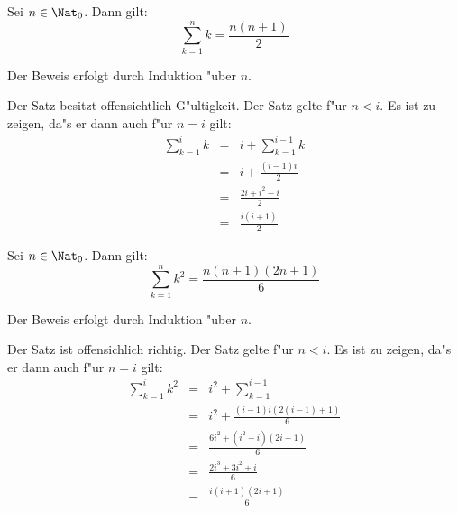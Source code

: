 \begin{lemma}
\label{SatzSumK}
    Sei $n \in \Nat_0$. Dann gilt:
    \[ \sum_{k=1}^n k = \frac{ n(n+1) }{ 2 } \]
\end{lemma}
\begin{beweis}
    Der Beweis erfolgt durch Induktion "uber $n$.
    \begin{MyDescription}
        Der Satz besitzt offensichtlich G"ultigkeit.
        Der Satz gelte f"ur $n<i$. Es ist zu zeigen, da"s er dann auch
        f"ur $n=i$ gilt:
        \begin{eqnarray*}
            \sum_{k=1}^i k & = & i + \sum_{k=1}^{i-1} k \\
            & = & 
                i + \frac{ (i-1)i }{ 2 } \\
            & = & \frac{ 2i+i^2-i }{ 2 } \\
            & = & \frac{ i(i+1) }{ 2 }
        \end{eqnarray*}
    \end{MyDescription}
\end{beweis}

\begin{lemma}
\label{SatzSumK2}
    Sei $n \in \Nat_0$. Dann gilt:
    \[ \sum_{k=1}^n k^2 = \frac{ n(n+1)(2n+1) }{ 6 } \]
\end{lemma}
\begin{beweis}
    Der Beweis erfolgt durch Induktion "uber $n$.
    \begin{MyDescription}
        Der Satz ist offensichlich richtig.
        Der Satz gelte f"ur $n<i$. Es ist zu zeigen, da"s er dann auch
        f"ur $n=i$ gilt:
        \begin{eqnarray*}
            \sum_{k=1}^i k^2 & = & i^2 + \sum_{k=1}^{i-1} \\
            & = & 
                i^2 + \frac{ (i-1)i(2(i-1)+1) }{ 6 } \\
            & = & 
                \frac{ 6i^2+(i^2-i)(2i-1) }{ 6 } \\
            & = & 
                \frac{ 2i^3 + 3i^2 + i }{ 6 } \\
            & = & 
                \frac{ i(i+1)(2i+1) }{ 6 }
        \end{eqnarray*}
    \end{MyDescription}
\end{beweis}

